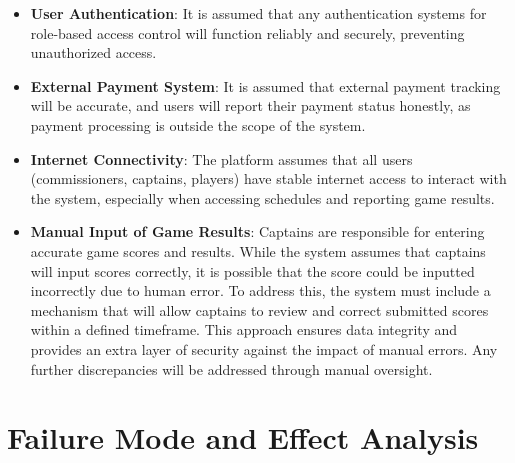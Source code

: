 \documentclass{article}
\begin{document}
\begin{itemize}
    \item \textbf{User Authentication}: It is assumed that any authentication systems for role-based access control will function reliably and securely, preventing unauthorized access.
    \item \textbf{External Payment System}: It is assumed that external payment tracking will be accurate, and users will report their payment status honestly, as payment processing is outside the scope of the system.
    \item \textbf{Internet Connectivity}: The platform assumes that all users (commissioners, captains, players) have stable internet access to interact with the system, especially when accessing schedules and reporting game results.
    \item \textbf{Manual Input of Game Results}: Captains are responsible for entering accurate game scores and results.
    While the system assumes that captains will input scores correctly, it is possible that the score could be inputted incorrectly due to human error. To address this, the system must include a mechanism that will allow captains to review and correct submitted scores within a defined timeframe. This approach ensures data integrity and provides an extra layer of security against the impact of manual errors. Any further discrepancies will be addressed through manual oversight.
\end{itemize}

\section{Failure Mode and Effect Analysis}
\end{document}
